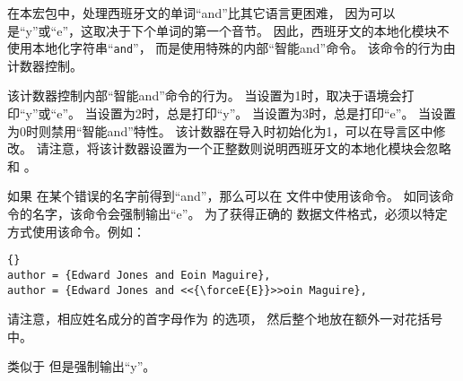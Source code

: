在本宏包中，处理西班牙文的单词“and”比其它语言更困难，
因为可以是“y”或“e”，这取决于下个单词的第一个音节。
因此，西班牙文的本地化模块不使用本地化字符串“\texttt{and}”，
而是使用特殊的内部“智能and”命令。
该命令的行为由  计数器控制。

\begin{ltxsyntax}



该计数器控制内部“智能and”命令的行为。
当设置为1时，取决于语境会打印“y”或“e”。
当设置为2时，总是打印“y”。
当设置为3时，总是打印“e”。
当设置为0时则禁用“智能and”特性。
该计数器在导入时初始化为1，可以在导言区中修改。
请注意，将该计数器设置为一个正整数则说明西班牙文的本地化模块会忽略  和 。



如果 \biblatex 在某个错误的名字前得到“and”，那么可以在  文件中使用该命令。
如同该命令的名字，该命令会强制输出“e”。
为了获得正确的 \BibTeX 数据文件格式，必须以特定方式使用该命令。例如：

\begin{lstlisting}[style=bibtex]{}
author = {Edward Jones and Eoin Maguire},
author = {Edward Jones and <<{\forceE{E}}>>oin Maguire},
\end{lstlisting}
%
请注意，相应姓名成分的首字母作为  的选项，
然后整个地放在额外一对花括号中。


类似于  但是强制输出“y”。

\end{ltxsyntax}

